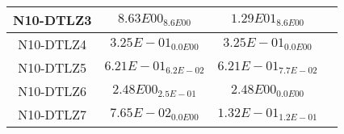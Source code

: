 \documentclass{article}
\begin{document}
\begin{table*}[ht!]
\begin{tabular}{|c||c||c||c|}
\hline
N10-DTLZ3 &\cellcolor{gray95}$8.63E00_{8.6E00}$ &\cellcolor{gray25}$1.29E01_{8.6E00}$\\ 
\hline
N10-DTLZ4 &\cellcolor{gray95}$3.25E-01_{0.0E00}$ &\cellcolor{gray25}$3.25E-01_{0.0E00}$\\ 
\hline
N10-DTLZ5 &\cellcolor{gray95}$6.21E-01_{6.2E-02}$ &\cellcolor{gray25}$6.21E-01_{7.7E-02}$\\ 
\hline
N10-DTLZ6 &\cellcolor{gray25}$2.48E00_{2.5E-01}$ &\cellcolor{gray95}$2.48E00_{0.0E00}$\\ 
\hline
N10-DTLZ7 &\cellcolor{gray95}$7.65E-02_{0.0E00}$ &\cellcolor{gray25}$1.32E-01_{1.2E-01}$\\ 
\hline
\end{tabular}
\end{table*}
\end{document}
